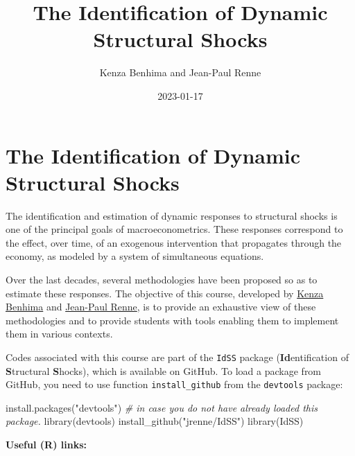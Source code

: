 \documentclass[
  12pt,
]{book}
\title{The Identification of Dynamic Structural Shocks}
\author{Kenza Benhima and Jean-Paul Renne}
\date{2023-01-17}
\newenvironment{Shaded}{\begin{snugshade}}{\end{snugshade}}
\newcommand{\CommentTok}[1]{\textcolor[rgb]{0.56,0.35,0.01}{\textit{#1}}}
\newcommand{\FunctionTok}[1]{\textcolor[rgb]{0.00,0.00,0.00}{#1}}
\newcommand{\NormalTok}[1]{#1}
\newcommand{\StringTok}[1]{\textcolor[rgb]{0.31,0.60,0.02}{#1}}
\theoremstyle{definition}
\theoremstyle{definition}
\theoremstyle{definition}
\theoremstyle{definition}
\theoremstyle{remark}
\begin{document}
\maketitle

{
\setcounter{tocdepth}{1}
\tableofcontents
}
\newcommand{\bv}[1]{\mathbf{#1}}

\hypertarget{intro}{%
\chapter*{The Identification of Dynamic Structural Shocks}\label{intro}}

The identification and estimation of dynamic responses to structural shocks is one of the principal goals of macroeconometrics. These responses correspond to the effect, over time, of an exogenous intervention that propagates through the economy, as modeled by a system of simultaneous equations.

Over the last decades, several methodologies have been proposed so as to estimate these responses. The objective of this course, developed by \href{https://sites.google.com/site/benhimakenza/}{Kenza Benhima} and \href{https://sites.google.com/site/jeanpaulrenne/home}{Jean-Paul Renne}, is to provide an exhaustive view of these methodologies and to provide students with tools enabling them to implement them in various contexts.

Codes associated with this course are part of the \texttt{IdSS} package (\textbf{Id}entification of \textbf{S}tructural \textbf{S}hocks), which is available on GitHub. To load a package from GitHub, you need to use function \texttt{install\_github} from the \texttt{devtools} package:

\begin{Shaded}
\begin{Highlighting}[]
\FunctionTok{install.packages}\NormalTok{(}\StringTok{"devtools"}\NormalTok{) }\CommentTok{\# in case you do not have already loaded this package.}
\FunctionTok{library}\NormalTok{(devtools)}
\FunctionTok{install\_github}\NormalTok{(}\StringTok{"jrenne/IdSS"}\NormalTok{)}
\FunctionTok{library}\NormalTok{(IdSS)}
\end{Highlighting}
\end{Shaded}

\textbf{Useful (R) links:}
\end{document}
